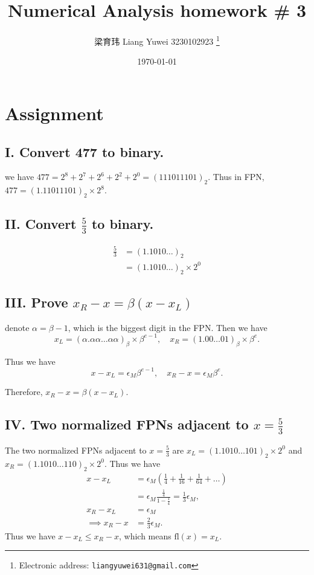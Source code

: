 \documentclass[a4paper]{article}
\newcommand{\esm}{\epsilon_M}
\newcommand{\fl}{\text{fl}}
\begin{document}
\title{Numerical Analysis homework \# 3}

\author{梁育玮 Liang Yuwei 3230102923
  \thanks{Electronic address: \texttt{liangyuwei631@gmail.com}}}
\date{\today}

\maketitle


\section{Assignment}
\subsection*{I. Convert 477 to binary.}
we have $477 = 2^8 + 2^7 + 2^6 + 2^2 + 2^0 = (111011101)_2$. Thus in FPN, $477 = (1.11011101)_2 \times 2^8$.

\subsection*{II. Convert $\frac{5}{3}$ to binary.}
\begin{align*} 
  \frac{5}{3} &= (1.1010\dots)_2 \\
  &= (1.1010\dots )_2 \times 2^0
\end{align*}

\subsection*{III. Prove $x_R - x = \beta(x - x_L)$}
denote $\alpha = \beta -1$, which is the biggest digit in the FPN. Then we have
\[x_L = (\alpha.\alpha\alpha\ldots\alpha\alpha)_{\beta} \times \beta^{e-1},\quad x_R = (1.00\ldots 01)_{\beta} \times \beta^{e} .\]

Thus we have
\[x - x_L = \epsilon_M \beta^{e-1},\quad x_R - x = \epsilon_M \beta^{e}.\]

Therefore, $x_R - x = \beta(x - x_L)$.

\subsection*{IV. Two normalized FPNs adjacent to $x = \frac{5}{3}$}
The two normalized FPNs adjacent to $x = \frac{5}{3}$ are $x_L = (1.1010\dots101)_2 \times 2^0$ and $x_R = (1.1010\dots110)_2 \times 2^0$. 
Thus we have \begin{align*}
  x - x_L &= \epsilon_M (\frac{1}{4} + \frac{1}{16} + \frac{1}{64} + \dots)\\
&= \esm \frac{\frac{1}{4}}{1-\frac{1}{4}} = \frac{1}{3} \esm,\\
  x_R - x_L &= \esm\\
  \implies x_R - x &= \frac{2}{3} \esm.
\end{align*}  
Thus we have $x - x_L \le x_R -x$, which means $\fl(x) = x_L$.
\end{document}
